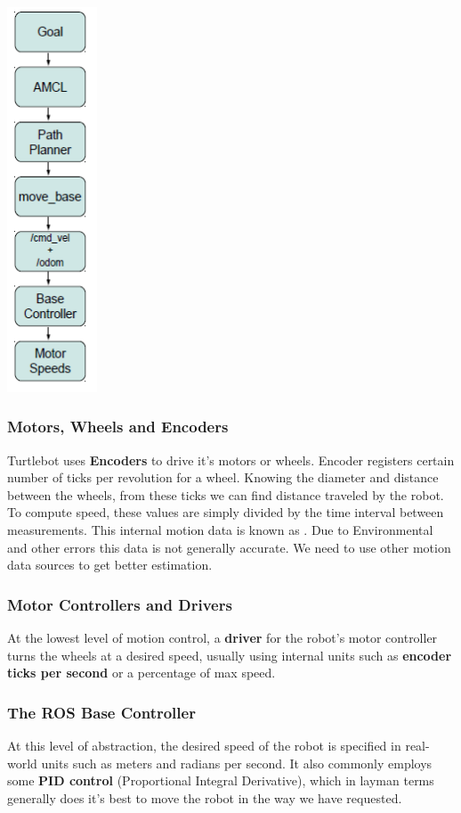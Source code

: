 \documentclass[10pt,a4paper]{article}
\begin{document}
\begin{center}
\includegraphics[width=0.2\textwidth]{motion_control.png}\\
\end{center}

\subsubsection{Motors, Wheels and Encoders}
Turtlebot uses \textbf{Encoders} to drive it's motors or wheels. Encoder registers certain number of ticks per revolution for a wheel. Knowing the diameter and distance between the wheels, from these ticks we can find distance traveled by the robot. To compute speed, these values are simply divided by the time interval between measurements.
This internal motion data is known as . Due to Environmental and other errors this data is not generally accurate. We need to use other motion data sources to get better estimation.

\subsubsection{Motor Controllers and Drivers}
At the lowest level of motion control, a \textbf{driver }for the robot's motor controller turns the wheels at a desired speed, usually using internal units such as \textbf{encoder ticks per second} or a percentage of max speed.

\subsubsection{The ROS Base Controller}
At this level of abstraction, the desired speed of the robot is specified in real-world units such as meters and radians per second. It also commonly employs some \textbf{PID control }(Proportional Integral Derivative), which in layman terms generally does it's best to move the robot in the way we have requested. 
\end{document}
